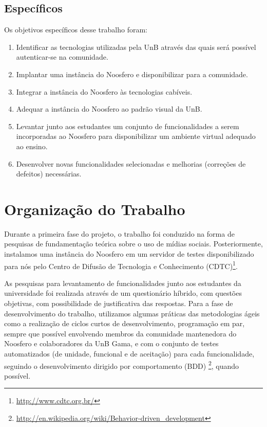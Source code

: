  
 
\subsection{Específicos}
 
Os objetivos específicos desse trabalho foram:
 
\begin{enumerate}
    
\item Identificar as tecnologias utilizadas pela UnB através das quais será
possível autenticar-se na comunidade.
\item Implantar uma instância do Noosfero e disponibilizar para a comunidade.
\item Integrar a instância do Noosfero às tecnologias cabíveis.
\item Adequar a instância do Noosfero ao padrão visual da UnB.
\item Levantar junto aos estudantes um conjunto de funcionalidades a serem
incorporadas ao Noosfero para disponibilizar um ambiente virtual adequado ao
ensino.
\item Desenvolver novas funcionalidades selecionadas e melhorias (correções de
defeitos) necessárias.
 
\end{enumerate}
 
 
\section{Organização do Trabalho}
 
Durante a primeira fase do projeto, o trabalho foi conduzido na forma de
pesquisas de fundamentação teórica sobre o uso de mídias sociais.
Posteriormente, instalamos uma instância do Noosfero em um
servidor de testes disponibilizado para nós pelo Centro de Difusão de
Tecnologia e Conhecimento (CDTC)\footnote{\url{http://www.cdtc.org.br/}}. 
 
As pesquisas para levantamento de funcionalidades junto aos estudantes
da universidade foi realizada através de um questionário híbrido, com questões
objetivas, com possibilidade de justificativa das respostas.
%
Para a fase de desenvolvimento do trabalho, utilizamos algumas práticas das
metodologias ágeis como a realização de ciclos curtos de desenvolvimento,
programação em par, sempre que possível envolvendo membros da comunidade
mantenedora do Noosfero e colaboradores da UnB Gama, e com o conjunto de
testes automatizados (de unidade, funcional e de aceitação) para cada funcionalidade,
seguindo o desenvolvimento dirigido por comportamento (BDD)%
\footnote{\url{http://en.wikipedia.org/wiki/Behavior-driven_development}},
quando possível.
 
